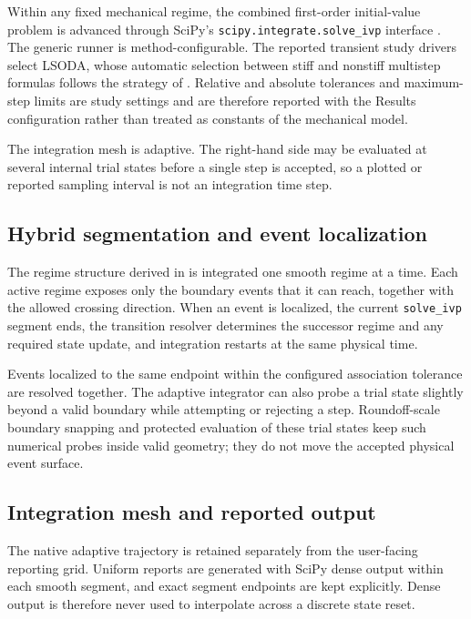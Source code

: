 \documentclass[11pt]{report}
\numberwithin{equation}{section}
\begin{document}
Within any fixed mechanical regime, the combined first-order initial-value
problem is advanced through SciPy's \texttt{scipy.integrate.solve\_ivp}
interface \citep{Virtanen2020}.  The generic runner is method-configurable.  The
reported transient study drivers select LSODA, whose automatic selection
between stiff and nonstiff multistep formulas follows the strategy of
\citet{Petzold1983}.  Relative and absolute tolerances and maximum-step limits
are study settings and are therefore reported with the Results configuration
rather than treated as constants of the mechanical model.

The integration mesh is adaptive.  The right-hand side may be evaluated at
several internal trial states before a single step is accepted, so a plotted or
reported sampling interval is not an integration time step.

\subsection{Hybrid segmentation and event localization}
\label{app:num_hybrid_segmentation}

The regime structure derived in  is integrated
one smooth regime at a time.  Each active regime exposes only the boundary
events that it can reach, together with the allowed crossing direction.  When
an event is localized, the current \texttt{solve\_ivp} segment ends, the
transition resolver determines the successor regime and any required state
update, and integration restarts at the same physical time.

Events localized to the same endpoint within the configured association
tolerance are resolved together.  The adaptive integrator can also probe a
trial state slightly beyond a valid boundary while attempting or rejecting a
step.  Roundoff-scale boundary snapping and protected evaluation of these trial
states keep such numerical probes inside valid geometry; they do not move the
accepted physical event surface.

\subsection{Integration mesh and reported output}
\label{app:num_reporting_grid}

The native adaptive trajectory is retained separately from the user-facing
reporting grid.  Uniform reports are generated with SciPy dense output within
each smooth segment, and exact segment endpoints are kept explicitly.  Dense
output is therefore never used to interpolate across a discrete state reset.
\end{document}
